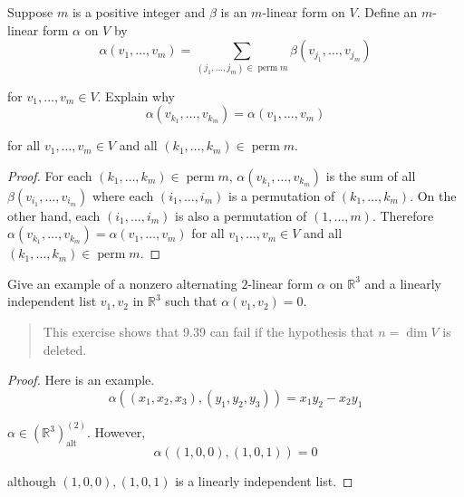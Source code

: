 \begin{exercise}\label{chapter9:sectionB:exercise6}
    Suppose $m$ is a positive integer and $\beta$ is an $m$-linear form on $V$. Define an $m$-linear form $\alpha$ on $V$ by
    \[
        \alpha(v_{1}, \ldots, v_{m}) = \sum_{(j_{1}, \ldots, j_{m})\in\operatorname{perm}m}\beta(v_{j_{1}}, \ldots, v_{j_{m}})
    \]

    for $v_{1}, \ldots, v_{m}\in V$. Explain why
    \[
        \alpha(v_{k_{1}}, \ldots, v_{k_{m}}) = \alpha(v_{1}, \ldots, v_{m})
    \]

    for all $v_{1}, \ldots, v_{m}\in V$ and all $(k_{1}, \ldots, k_{m})\in\operatorname{perm}m$.
\end{exercise}

\begin{proof}
    For each $(k_{1}, \ldots, k_{m})\in\operatorname{perm}m$, $\alpha(v_{k_{1}}, \ldots, v_{k_{m}})$ is the sum of all $\beta(v_{i_{1}}, \ldots, v_{i_{m}})$ where each $(i_{1}, \ldots, i_{m})$ is a permutation of $(k_{1}, \ldots, k_{m})$. On the other hand, each $(i_{1}, \ldots, i_{m})$ is also a permutation of $(1, \ldots, m)$. Therefore $\alpha(v_{k_{1}}, \ldots, v_{k_{m}}) = \alpha(v_{1}, \ldots, v_{m})$ for all $v_{1}, \ldots, v_{m}\in V$ and all $(k_{1}, \ldots, k_{m})\in\operatorname{perm}m$.
\end{proof}
\newpage

\begin{exercise}\label{chapter9:sectionB:exercise7}
    Give an example of a nonzero alternating $2$-linear form $\alpha$ on $\mathbb{R}^{3}$ and a linearly independent list $v_{1}, v_{2}$ in $\mathbb{R}^{3}$ such that $\alpha(v_{1}, v_{2}) = 0$.
\end{exercise}

\begin{quote}
    This exercise shows that 9.39 can fail if the hypothesis that $n = \dim V$ is deleted.
\end{quote}

\begin{proof}
    Here is an example.
    \[
        \alpha((x_{1}, x_{2}, x_{3}), (y_{1}, y_{2}, y_{3})) = x_{1}y_{2} - x_{2}y_{1}
    \]

    $\alpha\in {(\mathbb{R}^{3})}^{(2)}_{\text{alt}}$. However,
    \[
        \alpha((1, 0, 0), (1, 0, 1)) = 0
    \]

    although $(1, 0, 0), (1, 0, 1)$ is a linearly independent list.
\end{proof}
\newpage

